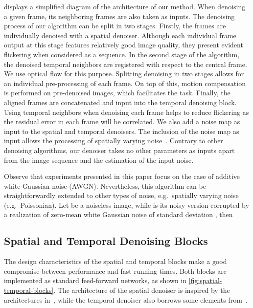 \documentclass{article}
\begin{document}
	 displays a simplified diagram of the architecture of our method. When denoising a given frame, its  neighboring frames are also taken as inputs. The denoising process of our algorithm can be split in two stages. Firstly, the  frames are individually denoised with a spatial denoiser. Although each individual frame output at this stage features relatively good image quality, they present evident flickering when considered as a sequence. In the second stage of the algorithm, the  denoised temporal neighbors are registered with respect to the central frame. We use optical flow for this purpose. Splitting denoising in two stages allows for an individual pre-processing of each frame. On top of this, motion compensation is performed on pre-denoised images, which facilitates the task. Finally, the  aligned frames are concatenated and input into the temporal denoising block. Using temporal neighbors when denoising each frame helps to reduce flickering as the residual error in each frame will be correlated. We also add a noise map as input to the spatial and temporal denoisers. The inclusion of the noise map as input allows the processing of spatially varying noise~\cite{ipol.2019.231}. Contrary to other denoising algorithms, our denoiser takes no other parameters as inputs apart from the image sequence and the estimation of the input noise.
	
	Observe that experiments presented in this paper focus on the case of additive white Gaussian noise (AWGN). Nevertheless, this algorithm can be straightforwardly extended to other types of noise, e.g.\ spatially varying noise (e.g.\ Poissonian). Let  be a noiseless image, while  is its noisy version corrupted by a realization of zero-mean white Gaussian noise  of standard deviation , then



	\subsection{Spatial and Temporal Denoising Blocks}
	\label{sec:spatial-temporal-blocks}	
	
	The design characteristics of the spatial and temporal blocks make a good compromise between performance and fast running times. Both blocks are implemented as standard feed-forward networks, as shown in \cref{fig:spatial-temporal-blocks}. The architecture of the spatial denoiser is inspired by the architectures in~\cite{Zhang2017a,Gharbi2016}, while the temporal denoiser also borrows some elements from~\cite{vogels2018denoising}.
	
\end{document}
